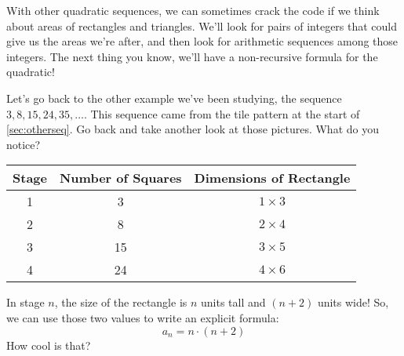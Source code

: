 With other quadratic sequences, we can sometimes crack the code if we think about areas of rectangles and triangles. We'll look for pairs of integers that could give us the areas we're after, and then look for arithmetic sequences among those integers. The next thing you know, we'll have a non-recursive formula for the quadratic!

Let's go back to the other example we've been studying, the sequence $3, 8, 15, 24, 35, \dotsc$. This sequence came from the tile pattern at the start of \cref{sec:otherseq}. Go back and take another look at those pictures. What do you notice?

\begin{table}
\begin{tabular}{c|c|c}
Stage		& Number of Squares		& Dimensions of Rectangle	\\\hline
1			& 3							& $1 \times 3$		\\
2			& 8							& $2 \times 4$		\\
3			& 15						& $3 \times 5$		\\
4			& 24						& $4 \times 6$		\\
\end{tabular}
\end{table}%

In stage $n$, the size of the rectangle is $n$ units tall and $(n+2)$ units wide! So, we can use those two values to write an explicit formula:
\[a_n = n \cdot (n+2)\]
How cool is that?

